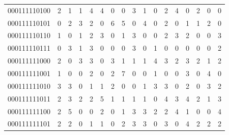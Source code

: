 \documentclass[10pt,a4paper]{article}
\begin{document}
\begin{longtable}{ |c|c|c|c|c|c|c|c|c|c|c|c|c|c|c|c|c| }
    000111110100              & 2                            & 1                                & 1                            & 4                              & 4   & 0   & 0   & 3   & 1   & 0   & 2   & 4   & 0   & 2   & 0   & 0   \\
    000111110101              & 0                            & 2                                & 3                            & 2                              & 0   & 6   & 5   & 0   & 4   & 0   & 2   & 0   & 1   & 1   & 2   & 0   \\
    000111110110              & 1                            & 0                                & 1                            & 2                              & 3   & 0   & 1   & 3   & 0   & 0   & 2   & 3   & 2   & 0   & 0   & 3   \\
    000111110111              & 0                            & 3                                & 1                            & 3                              & 0   & 0   & 0   & 3   & 0   & 1   & 0   & 0   & 0   & 0   & 0   & 2   \\
    000111111000              & 2                            & 0                                & 3                            & 3                              & 0   & 3   & 1   & 1   & 1   & 4   & 3   & 2   & 3   & 2   & 1   & 2   \\
    000111111001              & 1                            & 0                                & 0                            & 2                              & 0   & 2   & 7   & 0   & 0   & 1   & 0   & 0   & 3   & 0   & 4   & 0   \\
    000111111010              & 3                            & 3                                & 0                            & 1                              & 1   & 2   & 0   & 0   & 1   & 3   & 3   & 0   & 2   & 0   & 3   & 2   \\
    000111111011              & 2                            & 3                                & 2                            & 2                              & 5   & 1   & 1   & 1   & 1   & 0   & 4   & 3   & 4   & 2   & 1   & 3   \\
    000111111100              & 2                            & 5                                & 0                            & 0                              & 2   & 0   & 1   & 3   & 3   & 2   & 2   & 4   & 1   & 0   & 0   & 4   \\
    000111111101              & 2                            & 2                                & 0                            & 1                              & 1   & 0   & 2   & 3   & 3   & 0   & 3   & 0   & 4   & 2   & 2   & 2   \\

\end{longtable}
\end{document}
